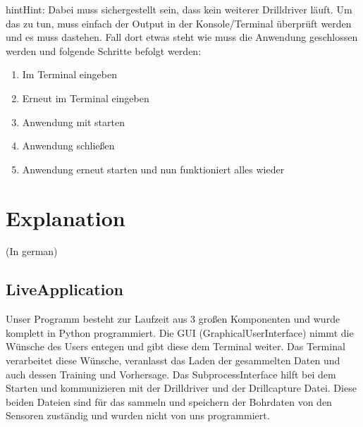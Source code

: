 \documentclass[letterpaper,10pt,english]{sphinxmanual}
\begin{document}
\begin{sphinxadmonition}{hint}{Hint:}
\sphinxAtStartPar
Dabei muss sichergestellt sein, dass kein weiterer Drilldriver läuft. Um das zu tun, muss einfach der Output in der Konsole/Terminal überprüft werden und es muss  dastehen. Fall dort etwas steht wie  muss die Anwendung geschlossen werden und folgende Schritte befolgt werden:
\begin{enumerate}
%
\item {} 
\sphinxAtStartPar
Im Terminal  eingeben

\item {} 
\sphinxAtStartPar
Erneut  im Terminal eingeben

\item {} 
\sphinxAtStartPar
Anwendung mit  starten

\item {} 
\sphinxAtStartPar
Anwendung schließen

\item {} 
\sphinxAtStartPar
Anwendung erneut starten und nun funktioniert alles wieder

\end{enumerate}
\end{sphinxadmonition}


\chapter{Explanation}
\label{\detokenize{explain:explanation}}\label{\detokenize{explain::doc}}
\sphinxAtStartPar
(In german)


\section{Live\sphinxhyphen{}Application}
\label{\detokenize{explain:live-application}}
\sphinxAtStartPar
Unser Programm besteht zur Laufzeit aus 3 großen Komponenten und wurde komplett in Python programmiert. Die GUI (Graphical\sphinxhyphen{}User\sphinxhyphen{}Interface) nimmt die Wünsche des Users entegen und gibt diese dem Terminal weiter. Das Terminal verarbeitet diese Wünsche, veranlasst das Laden der gesammelten Daten und auch dessen Training und Vorhersage.
Das Subprocess\sphinxhyphen{}Interface hilft bei dem Starten und kommunizieren mit der Drilldriver und der Drillcapture Datei. Diese beiden Dateien sind für das sammeln und speichern der Bohrdaten von den Sensoren zuständig und wurden nicht von uns programmiert.
\end{document}
